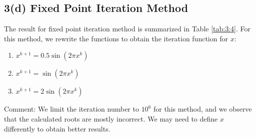 \documentclass[11pt]{article}
\newcommand{\1}{\mathbbm{1}}
\begin{document}
\subsection*{3(d) Fixed Point Iteration Method}
The result for fixed point iteration method is summarized in Table \ref{tab:3:4}. For this method, we rewrite the functions to obtain the iteration function for $x$:
\begin{enumerate}
	\item $x^{k+1}= 0.5 \sin(2 \pi x^k)$
	\item $x^{k+1}= \sin(2\pi x^k)$
	\item $x^{k+1}= 2 \sin(2\pi x^k)$
\end{enumerate}
Comment: We limit the iteration number to $10^6$ for this method, and we observe that the calculated roots are mostly incorrect. We may need to define $x$ differently to obtain better results.
\end{document}
